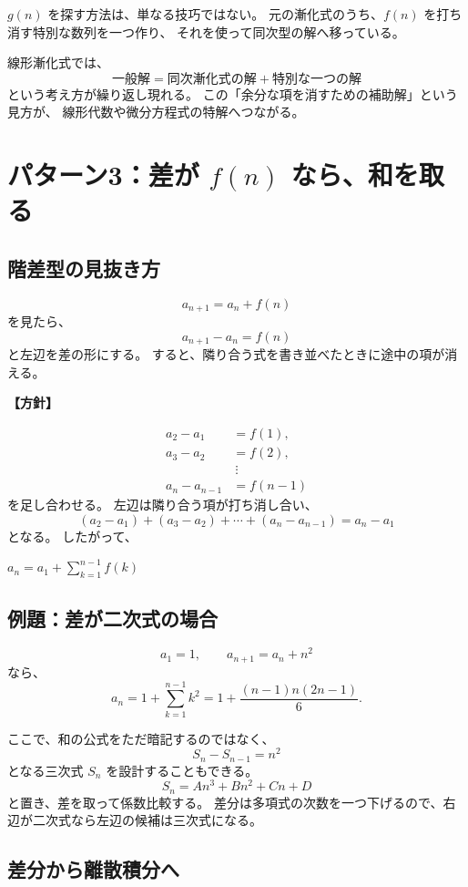 $g(n)$ を探す方法は、単なる技巧ではない。
元の漸化式のうち、$f(n)$ を打ち消す特別な数列を一つ作り、
それを使って同次型の解へ移っている。

線形漸化式では、
\[
  \text{一般解}
  =
  \text{同次漸化式の解}
  +
  \text{特別な一つの解}
\]
という考え方が繰り返し現れる。
この「余分な項を消すための補助解」という見方が、
線形代数や微分方程式の特解へつながる。

\section{パターン3：差が $f(n)$ なら、和を取る}

\subsection{階差型の見抜き方}

\[
  a_{n+1}=a_n+f(n)
\]
を見たら、
\[
  a_{n+1}-a_n=f(n)
\]
と左辺を差の形にする。
すると、隣り合う式を書き並べたときに途中の項が消える。

\noindent\textbf{【方針】}

\[
  \begin{aligned}
    a_2-a_1     & =f(1),   \\
    a_3-a_2     & =f(2),   \\
                & \ \vdots \\
    a_n-a_{n-1} & =f(n-1)
  \end{aligned}
\]
を足し合わせる。
左辺は隣り合う項が打ち消し合い、
\[
  (a_2-a_1)+(a_3-a_2)+\cdots+(a_n-a_{n-1})
  =a_n-a_1
\]
となる。
したがって、
\begin{mdquote}
  $a_n=a_1+\sum_{k=1}^{n-1}f(k)$
\end{mdquote}

\subsection{例題：差が二次式の場合}

\[
  a_1=1,\qquad a_{n+1}=a_n+n^2
\]
なら、
\[
  a_n=1+\sum_{k=1}^{n-1}k^2
  =1+\frac{(n-1)n(2n-1)}6.
\]

ここで、和の公式をただ暗記するのではなく、
\[
  S_n-S_{n-1}=n^2
\]
となる三次式 $S_n$ を設計することもできる。
\[
  S_n=An^3+Bn^2+Cn+D
\]
と置き、差を取って係数比較する。
差分は多項式の次数を一つ下げるので、右辺が二次式なら左辺の候補は三次式になる。

\subsection{差分から離散積分へ}

